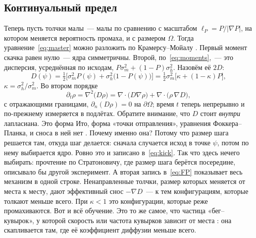 \documentclass[pre,twocolumn,superscriptaddress,showpacs=false,amsmath,amssymb,nofootinbib]{revtex4-2}
\begin{document}
\subsection{Континуальный предел}
Теперь пусть толчки малы~--- малы по сравнению с масштабом $\ell_P=P/|\nabla P|$, на котором меняется вероятность промаха, и с размером $\Omega$. Тогда уравнение~\eqref{eq:master} можно разложить по Крамерсу--Мойалу \cite{vanKampen1988}. Первый момент скачка равен нулю~--- ядра симметричны. Второй, по~\eqref{eq:moments},~--- это дисперсия, усреднённая по исходам, $P\sigma_m^2+(1-P)\sigma_h^2$. Назовём её $2D$:
\begin{equation}
D(\psi)=\tfrac12\bigl[\sigma_m^2P(\psi)+\sigma_h^2\bigl(1-P(\psi)\bigr)\bigr]
=\tfrac12\sigma_m^2\bigl[\kappa+(1-\kappa)P\bigr],
\label{eq:D}
\end{equation}
$\kappa=\sigma_h^2/\sigma_m^2$. Во втором порядке
\begin{equation}
\partial_t\rho=\nabla^2\bigl(D\rho\bigr)=\nabla\cdot\bigl(D\nabla\rho\bigr)+\nabla\cdot\bigl(\rho\,\nabla D\bigr),
\label{eq:FP}
\end{equation}
с отражающими границами, $\partial_n(D\rho)=0$ на $\partial\Omega$; время $t$ теперь непрерывно и по-прежнему измеряется в подлётах. Обратите внимание, что $D$ стоит \emph{внутри} лапласиана. Это форма Ито, форма «точки отправления», уравнения Фоккера--Планка, и сноса в ней нет \cite{Schnitzer1993,vanKampen1988,Volpe2016}. Почему именно она? Потому что размер шага решается там, откуда шаг делается: сначала случается исход в точке $\psi$, потом по нему выбирается ядро. Ровно это и записано в~\eqref{eq:kick}. Так что здесь нечего выбирать: прочтение по Стратоновичу, где размер шага берётся посередине, описывало бы другой эксперимент. А вторая запись в~\eqref{eq:FP} показывает весь механизм в одной строке. Ненаправленные толчки, размер которых меняется от места к месту, дают эффективный снос $-\nabla D$~--- к тем конфигурациям, которые толкают меньше всего. При $\kappa<1$ это конфигурации, которые реже промахиваются. Вот и всё обучение. Это то же самое, что частица «бег--кувырок», у которой скорость или частота кувырков зависит от места \cite{Schnitzer1993}: она скапливается там, где её коэффициент диффузии меньше всего.
\end{document}
